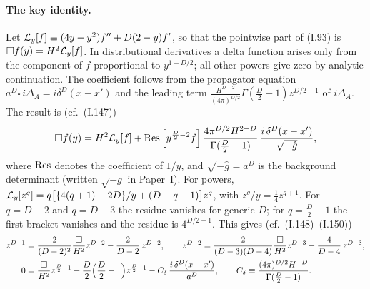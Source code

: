 \documentclass[aps,prd,onecolumn,10pt,nofootinbib,floatfix]{revtex4-2}
\newcommand{\PI}{Paper~I}
\newcommand{\eqI}[1]{(I.#1)}
\begin{document}
\paragraph*{The key identity.}
Let $\mathcal{L}_y[f]\equiv(4y-y^2)f''+D(2-y)f'$, so that the pointwise part of \eqI{93} is $\square f(y)=H^2\mathcal{L}_y[f]$.
In distributional derivatives a delta function arises only from the component of $f$ proportional to $y^{1-D/2}$; all other powers give zero by analytic continuation.
The coefficient follows from the propagator equation $a^D\square\,i\Delta_A=i\delta^D(x-x')$ and the leading term $\frac{H^{D-2}}{(4\pi)^{D/2}}\Gamma(\frac D2-1)z^{D/2-1}$ of $i\Delta_A$.
The result is (cf.\ \eqI{147})
\begin{equation}
\square f(y)=H^2\mathcal{L}_y[f]+\operatorname{Res}\Big[y^{\frac D2-2}f\Big]\,\frac{4\pi^{D/2}H^{2-D}}{\Gamma(\frac D2-1)}\,\frac{i\,\delta^D(x-x')}{\sqrt{-\hat g}},
\label{eq:s5:147}
\end{equation}
where $\operatorname{Res}$ denotes the coefficient of $1/y$, and $\sqrt{-\hat g}=a^D$ is the background determinant (written $\sqrt{-g}$ in \PI).
For powers, $\mathcal{L}_y[z^q]=q\big[\{4(q+1)-2D\}/y+(D-q-1)\big]z^q$, with $z^q/y=\frac14z^{q+1}$.
For $q=D-2$ and $q=D-3$ the residue vanishes for generic $D$; for $q=\frac D2-1$ the first bracket vanishes and the residue is $4^{D/2-1}$.
This gives (cf.\ \eqI{148}--\eqI{150})
\begin{align}
z^{D-1}&=\frac{2}{(D-2)^2}\frac{\square}{H^2}z^{D-2}-\frac{2}{D-2}\,z^{D-2},\qquad
z^{D-2}=\frac{2}{(D-3)(D-4)}\frac{\square}{H^2}z^{D-3}-\frac{4}{D-4}\,z^{D-3},
\label{eq:s5:148}\\
0&=\frac{\square}{H^2}z^{\frac D2-1}-\frac D2\Big(\frac D2-1\Big)z^{\frac D2-1}-C_{\delta}\,\frac{i\,\delta^D(x-x')}{a^D},\qquad
C_{\delta}\equiv\frac{(4\pi)^{D/2}H^{-D}}{\Gamma(\frac D2-1)} .
\label{eq:s5:150}
\end{align}
\end{document}
